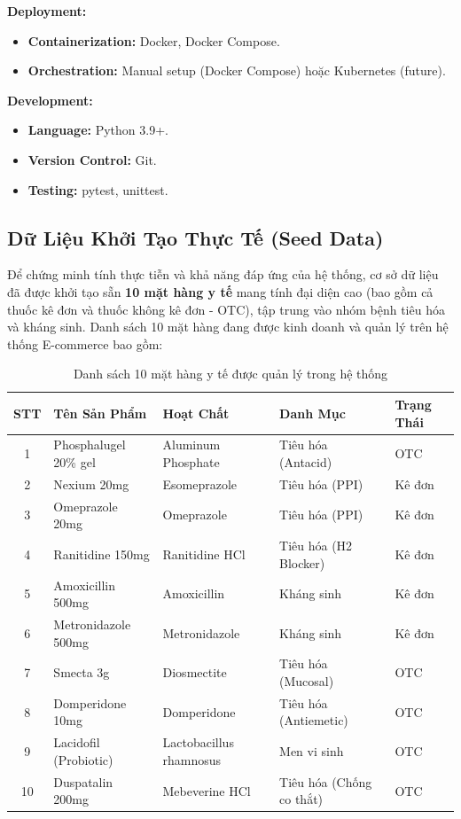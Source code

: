 \documentclass[12pt,a4paper]{article}
\begin{document}
\textbf{Deployment:}
\begin{itemize}
    \item \textbf{Containerization:} Docker, Docker Compose.
    \item \textbf{Orchestration:} Manual setup (Docker Compose) hoặc Kubernetes (future).
\end{itemize}

\textbf{Development:}
\begin{itemize}
    \item \textbf{Language:} Python 3.9+.
    \item \textbf{Version Control:} Git.
    \item \textbf{Testing:} pytest, unittest.
\end{itemize}

\subsection{Dữ Liệu Khởi Tạo Thực Tế (Seed Data)}

Để chứng minh tính thực tiễn và khả năng đáp ứng của hệ thống, cơ sở dữ liệu đã được khởi tạo sẵn \textbf{10 mặt hàng y tế} mang tính đại diện cao (bao gồm cả thuốc kê đơn và thuốc không kê đơn - OTC), tập trung vào nhóm bệnh tiêu hóa và kháng sinh. Danh sách 10 mặt hàng đang được kinh doanh và quản lý trên hệ thống E-commerce bao gồm:

\begin{table}[H]
    \centering
    \begin{tabularx}{\textwidth}{|c|X|l|l|l|}
        \hline
        \textbf{STT} & \textbf{Tên Sản Phẩm} & \textbf{Hoạt Chất} & \textbf{Danh Mục} & \textbf{Trạng Thái} \\
        \hline
        1 & Phosphalugel 20\% gel & Aluminum Phosphate & Tiêu hóa (Antacid) & OTC \\
        \hline
        2 & Nexium 20mg & Esomeprazole & Tiêu hóa (PPI) & Kê đơn \\
        \hline
        3 & Omeprazole 20mg & Omeprazole & Tiêu hóa (PPI) & Kê đơn \\
        \hline
        4 & Ranitidine 150mg & Ranitidine HCl & Tiêu hóa (H2 Blocker) & Kê đơn \\
        \hline
        5 & Amoxicillin 500mg & Amoxicillin & Kháng sinh & Kê đơn \\
        \hline
        6 & Metronidazole 500mg & Metronidazole & Kháng sinh & Kê đơn \\
        \hline
        7 & Smecta 3g & Diosmectite & Tiêu hóa (Mucosal) & OTC \\
        \hline
        8 & Domperidone 10mg & Domperidone & Tiêu hóa (Antiemetic) & OTC \\
        \hline
        9 & Lacidofil (Probiotic) & Lactobacillus rhamnosus & Men vi sinh & OTC \\
        \hline
        10 & Duspatalin 200mg & Mebeverine HCl & Tiêu hóa (Chống co thắt) & OTC \\
        \hline
    \end{tabularx}
    \caption{Danh sách 10 mặt hàng y tế được quản lý trong hệ thống}
    \label{tab:10products}
\end{table}
\end{document}
